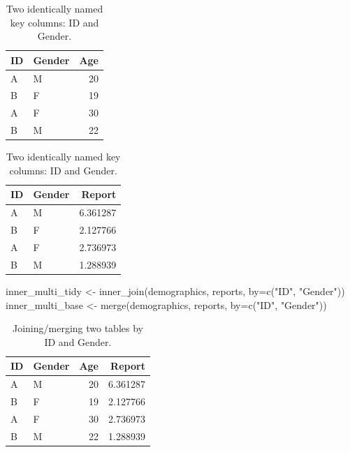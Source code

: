 \documentclass[
]{book}
\newenvironment{Shaded}{\begin{snugshade}}{\end{snugshade}}
\newcommand{\AttributeTok}[1]{\textcolor[rgb]{0.77,0.63,0.00}{#1}}
\newcommand{\FunctionTok}[1]{\textcolor[rgb]{0.00,0.00,0.00}{#1}}
\newcommand{\NormalTok}[1]{#1}
\newcommand{\OtherTok}[1]{\textcolor[rgb]{0.56,0.35,0.01}{#1}}
\newcommand{\StringTok}[1]{\textcolor[rgb]{0.31,0.60,0.02}{#1}}
\begin{document}
\begin{table}
\caption{\label{tab:unnamed-chunk-190}Two identically named key columns: ID and Gender.}

\centering
\begin{tabular}[t]{l|l|r}
\hline
ID & Gender & Age\\
\hline
A & M & 20\\
\hline
B & F & 19\\
\hline
A & F & 30\\
\hline
B & M & 22\\
\hline
\end{tabular}
\centering
\begin{tabular}[t]{l|l|r}
\hline
ID & Gender & Report\\
\hline
A & M & 6.361287\\
\hline
B & F & 2.127766\\
\hline
A & F & 2.736973\\
\hline
B & M & 1.288939\\
\hline
\end{tabular}
\end{table}

\begin{Shaded}
\begin{Highlighting}[]
\NormalTok{inner\_multi\_tidy }\OtherTok{\textless{}{-}} \FunctionTok{inner\_join}\NormalTok{(demographics, reports, }\AttributeTok{by=}\FunctionTok{c}\NormalTok{(}\StringTok{"ID"}\NormalTok{, }\StringTok{"Gender"}\NormalTok{))}
\NormalTok{inner\_multi\_base }\OtherTok{\textless{}{-}} \FunctionTok{merge}\NormalTok{(demographics, reports, }\AttributeTok{by=}\FunctionTok{c}\NormalTok{(}\StringTok{"ID"}\NormalTok{, }\StringTok{"Gender"}\NormalTok{))}
\end{Highlighting}
\end{Shaded}

\begin{table}

\caption{\label{tab:unnamed-chunk-192}Joining/merging two tables by ID and Gender.}
\centering
\begin{tabular}[t]{l|l|r|r}
\hline
ID & Gender & Age & Report\\
\hline
A & M & 20 & 6.361287\\
\hline
B & F & 19 & 2.127766\\
\hline
A & F & 30 & 2.736973\\
\hline
B & M & 22 & 1.288939\\
\hline
\end{tabular}
\end{table}
\end{document}

